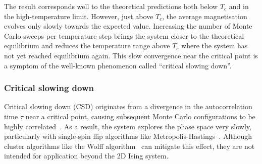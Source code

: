 
The \hotspice result corresponds well to the theoretical predictions both below $T_c$ and in the high-temperature limit.
However, just above $T_c$, the average magnetisation evolves only slowly towards the expected value.
Increasing the number of Monte Carlo sweeps per temperature step brings the system closer to the theoretical equilibrium and reduces the temperature range above $T_c$ where the system has not yet reached equilibrium again.
This slow convergence near the critical point is a symptom of the well-known phenomenon called ``critical slowing down''.

\subsubsection{Critical slowing down}
Critical slowing down (CSD) originates from a divergence in the autocorrelation time $\tau$ near a critical point, causing subsequent Monte Carlo configurations to be highly correlated~\cite{NumericalDynamicalNiedermayer,CompStatPhys,StatisticalMechanicsAlgorithmsComputations}.
As a result, the system explores the phase space very slowly, particularly with single-spin flip algorithms like Metropolis-Hastings~\cite{StatisticalMechanicsAlgorithmsComputations}.
Although cluster algorithms like the Wolff algorithm~\cite{Wolff} can mitigate this effect, they are not intended for application beyond the 2D Ising system.

